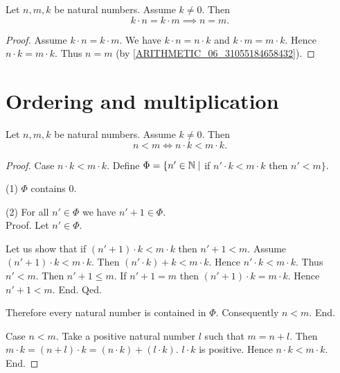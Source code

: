 \documentclass[../arithmetic.tex]{subfiles}
\begin{document}
  \begin{forthel}
    \begin{corollary}
      Let $n, m, k$ be natural numbers.
      Assume $k \neq 0$.
      Then \[ k \cdot n = k \cdot m \implies n = m. \]
    \end{corollary}
    \begin{proof}
      Assume $k \cdot n = k \cdot m$.
      We have $k \cdot n = n \cdot k$ and $k \cdot m = m \cdot k$.
      Hence $n \cdot k = m \cdot k$.
      Thus $n = m$ (by \cref{ARITHMETIC_06_31055184658432}).
    \end{proof}
  \end{forthel}


  \section{Ordering and multiplication}

  \begin{forthel}
    \begin{proposition}
      Let $n, m, k$ be natural numbers.
      Assume $k \neq 0$.
      Then \[ n \less m \iff n \cdot k \less m \cdot k. \]
    \end{proposition}
    \begin{proof}
      Case $n \cdot k \less m \cdot k$.
        Define $\Phi = \{ n' \in \mathbb{N} \mid$ if $n' \cdot k \less m \cdot k$ then
        $n' \less m \}$.

        (1) $\Phi$ contains $0$.

        (2) For all $n' \in \Phi$ we have $n' \plus 1 \in \Phi$. \\
        Proof.
          Let $n' \in \Phi$.

          Let us show that if $(n' \plus 1) \cdot k \less m \cdot k$ then $n' \plus 1 \less m$.
            Assume $(n' \plus 1) \cdot k \less m \cdot k$.
            Then $(n' \cdot k) \plus k \less m \cdot k$.
            Hence $n' \cdot k \less m \cdot k$.
            Thus $n' \less m$.
            Then $n' \plus 1 \leq m$.
            If $n' \plus 1 = m$ then $(n' \plus 1) \cdot k = m \cdot k$.
            Hence $n' \plus 1 \less m$.
          End.
        Qed.

        Therefore every natural number is contained in $\Phi$.
        Consequently $n \less m$.
      End.

      Case $n \less m$.
        Take a positive natural number $l$ such that $m = n \plus l$.
        Then $m \cdot k = (n \plus l) \cdot k = (n \cdot k) \plus (l \cdot k)$.
        $l \cdot k$ is positive.
        Hence $n \cdot k \less m \cdot k$.
      End.
    \end{proof}
  \end{forthel}
\end{document}
